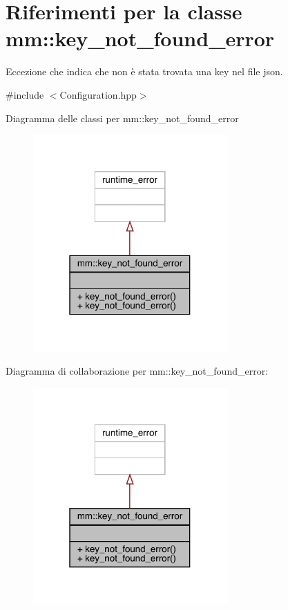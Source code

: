 \hypertarget{classmm_1_1key__not__found__error}{}\section{Riferimenti per la classe mm\+:\+:key\+\_\+not\+\_\+found\+\_\+error}
\label{classmm_1_1key__not__found__error}


Eccezione che indica che non è stata trovata una key nel file json.  




{\ttfamily \#include $<$Configuration.\+hpp$>$}



Diagramma delle classi per mm\+:\+:key\+\_\+not\+\_\+found\+\_\+error
\nopagebreak
\begin{figure}[H]
\begin{center}
\leavevmode
\includegraphics[width=211pt]{d4/de8/classmm_1_1key__not__found__error__inherit__graph}
\end{center}
\end{figure}


Diagramma di collaborazione per mm\+:\+:key\+\_\+not\+\_\+found\+\_\+error\+:
\nopagebreak
\begin{figure}[H]
\begin{center}
\leavevmode
\includegraphics[width=211pt]{d0/da9/classmm_1_1key__not__found__error__coll__graph}
\end{center}
\end{figure}
